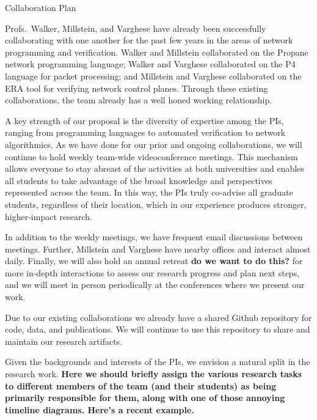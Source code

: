 \documentclass[12pt]{article}
\begin{document}
 \begin{large}
\begin{center}
Collaboration Plan
\end{center}
\end{large}
\setcounter{page}{1}

Profs.\ Walker, Millstein, and Varghese have already been successfully collaborating with one another for the past few years in the areas of network programming and verification.  Walker and Millstein collaborated on the Propane network programming language; Walker and Varghese collaborated on the P4 language for packet processing; and Millstein and Varghese collaborated on the ERA tool for verifying network control planes.  Through these existing collaborations, the team already has a well honed working relationship. 

A key strength of our proposal is the diversity of expertise among the PIs, ranging from programming languages to automated verification to network algorithmics.  As we have done for our prior and ongoing collaborations, we will continue to hold weekly team-wide videoconference meetings.  This mechanism allows everyone to stay abreast of the activities at both universities and enables all students to take advantage of the broad knowledge and perspectives represented across the team.  In this way, the PIs truly co-advise all graduate students, regardless of their location, which in our experience produces stronger, higher-impact research.  

In addition to the weekly meetings, we have frequent email discussions between meetings.  Further, Millstein and Varghese have nearby offices and interact almost daily.
Finally, we will also hold an annual retreat {\bf do we want to do this?} for more in-depth interactions to assess our research progress and plan next steps, and we will meet in person periodically at the conferences where we present our work.

Due to our existing collaborations we already have a shared Github repository for code, data, and publications.  We will continue to use this repository to share and maintain our research artifacts.

Given the backgrounds and interests of the PIs, we envision a natural
split in the research work.  {\bf Here we should briefly assign the various research tasks to different members of the team (and their students) as being primarily responsible for them, along with one of those annoying timeline diagrams.  Here's a recent example.}
\end{document}

